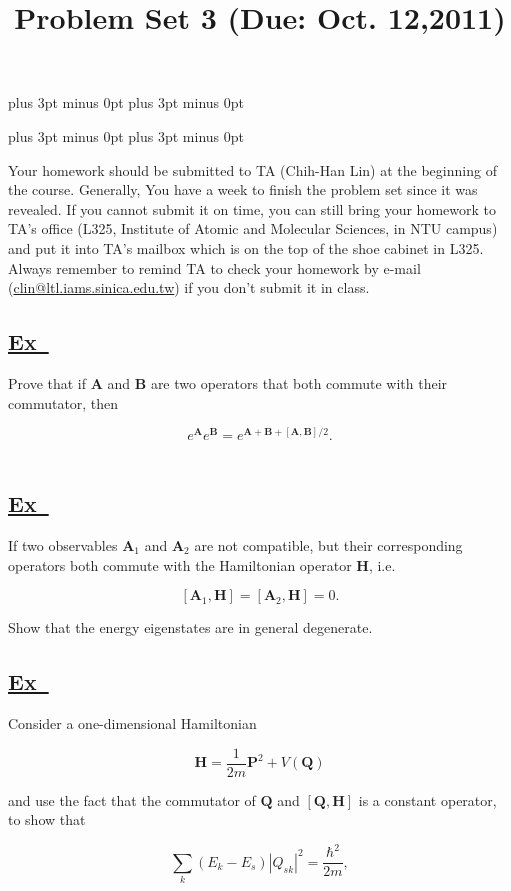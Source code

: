 \documentclass[a4paper,12pt]{article}
\newcommand{\excercise}{\addtocounter{section}{+1}
\subsection*{\underline{Ex~\thesection}}}
\begin{document}
\abovedisplayskip=-6pt plus 3pt minus 0pt
\belowdisplayskip=8pt plus 3pt minus 0pt

\abovedisplayshortskip=-6pt plus 3pt minus 0pt
\belowdisplayshortskip=8pt plus 3pt minus 0pt

\title{Problem Set 3 (Due: Oct. 12,2011)}
\maketitle

Your homework should be submitted to TA (Chih-Han Lin) at the  beginning of the course. Generally, You have a week to finish the problem set since it was revealed. If you cannot submit it on time, you can still bring your homework to TA's office (L325, Institute of Atomic and Molecular Sciences, in NTU campus) and put it into TA's mailbox which is on the top of the shoe cabinet in L325. Always remember to remind TA to check your homework by e-mail (\url{clin@ltl.iams.sinica.edu.tw}) if you don't submit it in class.

%

\excercise
Prove that if $ \mathbf{A} $ and $ \mathbf{B} $ are two operators that both commute with their commutator, then

$$
e^{\mathbf{A}}e^{\mathbf{B}}=e^{\mathbf{A}+\mathbf{B}+[\mathbf{A},\mathbf{B}]/2}.
$$\\[-5pt]

\excercise

If two observables  $ \mathbf{A}_1 $ and $ \mathbf{A}_2 $ are not compatible, but their corresponding operators both commute with the Hamiltonian operator $ \mathbf{H} $, i.e.

$$
[\mathbf{A}_1,\mathbf{H}]=[\mathbf{A}_2,\mathbf{H}]=0.
$$
 
Show that the energy eigenstates are in general degenerate.


\excercise

Consider a one-dimensional Hamiltonian

$$
\mathbf{H}=\frac{1}{2m}\mathbf{P}^2+V(\mathbf{Q})
$$

\noindent and use the fact that the commutator of $ \mathbf{Q} $ and $ [\mathbf{Q},\mathbf{H}] $  is a constant operator, to show that 

$$
\sum_k(E_k-E_s)|Q_{sk}|^2=\frac{\hbar^2}{2m},
$$
\end{document}
